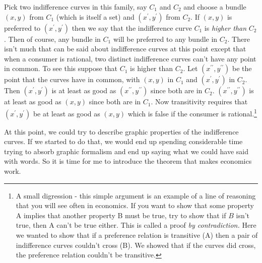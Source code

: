 \documentclass[12pt]{article}
\begin{document}
Pick two indifference
curves in this family, say $C_{1}$ and $C_{2}$ and choose a bundle $\left(
x,y\right)  $ from $C_{1}$ (which is itself a set) and $\left(  x^{\prime
},y^{\prime}\right)  $ from $C_{2}$. If $\left(  x,y\right)  $ is preferred to $\left(  x^{\prime},y^{\prime
}\right)  $ then we say that the indifference curve $C_{1}$ is \emph{higher
than }$C_{2}$. Then of course, any bundle in $C_{1}$ will be preferred to any
bundle in $C_{2}$. There isn't much that can be said about indifference curves
at this point except that when a consumer is rational, two distinct
indifference curves can't have any point in common. To see this suppose that
$C_{1}$ is higher than $C_{2}$. Let $\left(  x^{\prime\prime},y^{\prime\prime
}\right)  $ be the point that the curves have in common, with $\left(
x,y\right)  $ in $C_{1}$ and $\left(  x^{\prime},y^{\prime}\right)  $ in
$C_{2}$. Then $\left(  x^{\prime},y^{\prime}\right)  $ is at least as good as
$\left(  x^{\prime\prime},y^{\prime\prime}\right)  $ since both are in $C_{2}%
$. $\left(  x^{\prime\prime},y^{\prime\prime}\right)  $ is at least as good as
$\left(  x,y\right)  $ since both are in $C_{1}$. Now transitivity requires
that $\left(  x^{\prime},y^{\prime}\right)  $ be at least as good as $\left(
x,y\right)  $ which is false if the consumer is rational.\footnote{A small
digression - this simple argument is an example of a line of reasoning that
you will see often in economics. If you want to show that some property A
implies that another property B must be true, try to show that if $B$ isn't
true, then A can't be true either. This is called a proof \emph{by
contradiction.} Here we wanted to show that if a preference relation is
transitive (A) then a pair of indifference curves couldn't cross (B). We
showed that if the curves did cross, the preference relation couldn't be transitive.}

At this point, we could try to describe graphic properties of the indifference
curves. If we started to do that, we would end up spending considerable time
trying to absorb graphic formalism and end up saying what we could have said
with words. So it is time for me to introduce the theorem that makes economics work.
\end{document}
